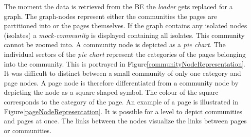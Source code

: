 The moment the data is retrieved from the BE the \textit{loader} gets replaced for a graph. The graph-nodes represent either the communities the pages are partitioned into or the pages themselves.  If the graph contains any isolated nodes (isolates) a \textit{mock-community} is displayed containing all isolates. This community cannot be zoomed into. A community node is depicted as a \textit{pie chart}. The individual sectors of the \textit{pie chart} represent the categories of the pages belonging into the community. This is portrayed in Figure\ref{communityNodeRepresentation}. It was difficult to distinct between a small community of only one category and page nodes. A page node is therefore differentiated from a community node by depicting the node as a square shaped symbol. The colour of the square corresponds to the category of the page. An example of a page is illustrated in Figure\ref{pageNodeRepresentation}. It is possible for a level to depict communities and pages at once. The links between the nodes visualize the links between pages or communities. 

